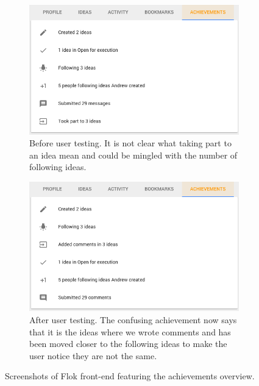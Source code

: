 \documentclass[a4paper,12pt, oneside]{article}
\begin{document}
\begin{figure}[!htb]
    \begin{subfigure}[t]{.495\textwidth}
        \includegraphics[width=\textwidth]{images/user_tests/achievements_before.png}
        \caption{Before user testing. It is not clear what taking part to an idea mean and could be mingled with the number of following ideas.}
        \label{fig.tests.achievements.before}
    \end{subfigure}
    \hfill
    \begin{subfigure}[t]{.495\textwidth}
        \includegraphics[width=\textwidth]{images/user_tests/achievements_after.png}
        \caption{After user testing. The confusing achievement now says that it is the ideas where we wrote comments and has been moved closer to the following ideas to make the user notice they are not the same.}
        \label{fig.tests.achievements.after}
    \end{subfigure}
    \caption{Screenshots of Flok front-end featuring the achievements overview.}
    \label{fig.tests.achievements}
\end{figure}
\end{document}

